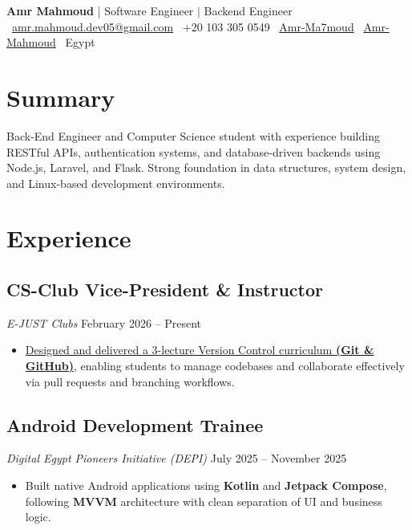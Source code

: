 \documentclass[11pt,a4paper]{article}
\begin{document}
\begin{center}
    {\LARGE \textbf{Amr Mahmoud }|}     {\large Software Engineer $\vert$ Backend Engineer} \\
    \vspace{6pt}
    \faEnvelope\ \href{mailto:amr.mahmoud.dev05@gmail.com}{amr.mahmoud.dev05@gmail.com}
    \faPhone\ +20 103 305 0549 \quad
    \faGithub\ \href{https://github.com/Amr-Ma7moud}{Amr-Ma7moud}\quad
    \faLinkedinSquare\ \href{https://www.linkedin.com/in/amr-mahmoud-}{Amr-Mahmoud} \quad
    \faMapMarker\ Egypt
\end{center}

\section{Summary}Back-End Engineer and Computer Science student with experience building RESTful APIs, authentication systems, and database-driven backends using Node.js, Laravel, and Flask. Strong foundation in data structures, system design, and Linux-based development environments.

\section{Experience}

\subsection{CS-Club Vice-President \& Instructor}
    \textit{E-JUST Clubs} \hfill February 2026 -- Present
    \begin{itemize}
        \item \href{https://cs-club-pearl.vercel.app/courses/version-control-git-github}{Designed and delivered a 3-lecture Version Control curriculum \textbf{(Git \& GitHub)}}, enabling students to manage codebases and collaborate effectively via pull requests and branching workflows.
    \end{itemize}

\subsection{Android Development Trainee}
\textit{Digital Egypt Pioneers Initiative (DEPI)} \hfill July 2025 -- November 2025
\begin{itemize}
    \item Built native Android applications using \textbf{Kotlin} and \textbf{Jetpack Compose}, following \textbf{MVVM} architecture with clean separation of UI and business logic.
\end{itemize}
\end{document}
